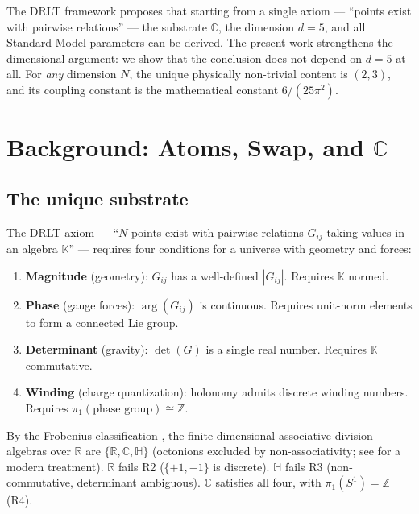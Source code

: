 \documentclass[12pt]{article}
\theoremstyle{remark}
\begin{document}
The DRLT framework proposes that starting from a single axiom --- ``points exist with pairwise relations'' --- the substrate $\mathbb{C}$, the dimension $d = 5$, and all Standard Model parameters can be derived. The present work strengthens the dimensional argument: we show that the conclusion does not depend on $d = 5$ at all. For \emph{any} dimension $N$, the unique physically non-trivial content is $(2, 3)$, and its coupling constant is the mathematical constant $6/(25\pi^2)$.

\section{Background: Atoms, Swap, and $\mathbb{C}$}

\subsection{The unique substrate}

The DRLT axiom --- ``$N$ points exist with pairwise relations $G_{ij}$ taking values in an algebra $\mathbb{K}$'' --- requires four conditions for a universe with geometry and forces:

\begin{enumerate}
\item[\textbf{R1.}] \textbf{Magnitude} (geometry): $G_{ij}$ has a well-defined $|G_{ij}|$. Requires $\mathbb{K}$ normed.
\item[\textbf{R2.}] \textbf{Phase} (gauge forces): $\arg(G_{ij})$ is continuous. Requires unit-norm elements to form a connected Lie group.
\item[\textbf{R3.}] \textbf{Determinant} (gravity): $\det(G)$ is a single real number. Requires $\mathbb{K}$ commutative.
\item[\textbf{R4.}] \textbf{Winding} (charge quantization): holonomy admits discrete winding numbers. Requires $\pi_1(\text{phase group}) \cong \mathbb{Z}$.
\end{enumerate}

By the Frobenius classification \cite{Frobenius, Hurwitz}, the
finite-dimensional associative division algebras over $\mathbb{R}$ are
$\{\mathbb{R}, \mathbb{C}, \mathbb{H}\}$ (octonions excluded by
non-associativity; see \cite{Baez} for a modern treatment). $\mathbb{R}$ fails R2 ($\{+1,-1\}$ is discrete). $\mathbb{H}$ fails R3 (non-commutative, determinant ambiguous). $\mathbb{C}$ satisfies all four, with $\pi_1(S^1) = \mathbb{Z}$ (R4).
\end{document}
